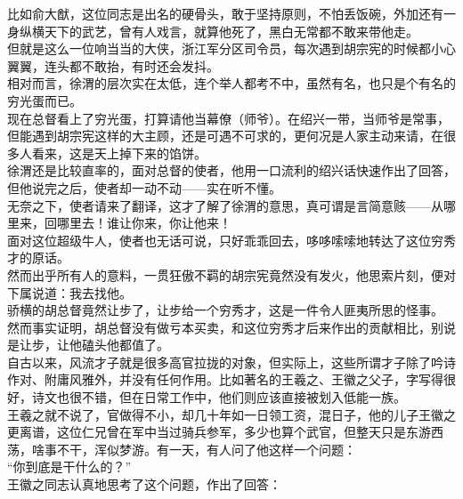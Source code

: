 \begin{multicols}{\theparacolNo}
比如俞大猷，这位同志是出名的硬骨头，敢于坚持原则，不怕丢饭碗，外加还有一身纵横天下的武艺，曾有人戏言，就算他死了，黑白无常都不敢来带他走。\\

但就是这么一位响当当的大侠，浙江军分区司令员，每次遇到胡宗宪的时候都小心翼翼，连头都不敢抬，有时还会发抖。\\

相对而言，徐渭的层次实在太低，连个举人都考不中，虽然有名，也只是个有名的穷光蛋而已。\\

现在总督看上了穷光蛋，打算请他当幕僚（师爷）。在绍兴一带，当师爷是常事，但能遇到胡宗宪这样的大主顾，还是可遇不可求的，更何况是人家主动来请，在很多人看来，这是天上掉下来的馅饼。\\

徐渭还是比较直率的，面对总督的使者，他用一口流利的绍兴话快速作出了回答，但他说完之后，使者却一动不动——实在听不懂。\\

无奈之下，使者请来了翻译，这才了解了徐渭的意思，真可谓是言简意赅——从哪里来，回哪里去！谁让你来，你让他来！\\

面对这位超级牛人，使者也无话可说，只好乖乖回去，哆哆嗦嗦地转达了这位穷秀才的原话。\\

然而出乎所有人的意料，一贯狂傲不羁的胡宗宪竟然没有发火，他思索片刻，便对下属说道：我去找他。\\

骄横的胡总督竟然让步了，让步给一个穷秀才，这是一件令人匪夷所思的怪事。\\

然而事实证明，胡总督没有做亏本买卖，和这位穷秀才后来作出的贡献相比，别说是让步，让他磕头他都值了。\\

自古以来，风流才子就是很多高官拉拢的对象，但实际上，这些所谓才子除了吟诗作对、附庸风雅外，并没有任何作用。比如著名的王羲之、王徽之父子，字写得很好，诗文也很不错，但在日常工作中，他们则应该直接被划入低能一族。\\

王羲之就不说了，官做得不小，却几十年如一日领工资，混日子，他的儿子王徽之更离谱，这位仁兄曾在军中当过骑兵参军，多少也算个武官，但整天只是东游西荡，啥事不干，浑似梦游。有一天，有人问了他这样一个问题：\\

“你到底是干什么的？”\\

王徽之同志认真地思考了这个问题，作出了回答：\\


\end{multicols}
